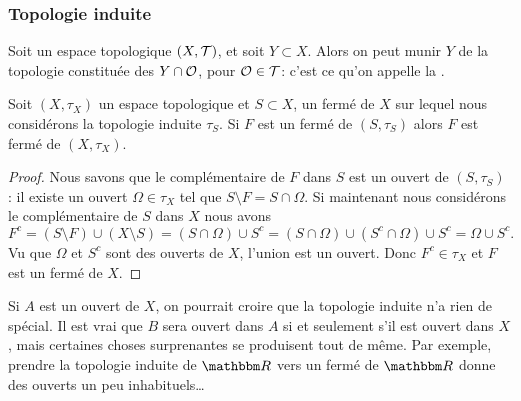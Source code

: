 \subsubsection{Topologie induite}

\begin{definition} \label{DefVLrgWDB}
  Soit un espace topologique \( (X, \mathcal{T}) \), et soit \( Y \subset X \). Alors on peut munir \( Y \) de la topologie constituée des \( Y \cap \mathcal{O} \), pour \( \mathcal{O} \in \mathcal{T} \): c'est ce qu'on appelle la .
\end{definition}


\begin{lemma}        \label{LemBWSUooCCGvax}
    Soit \( (X,\tau_X)\) un espace topologique et \( S\subset X\), un fermé de \( X\) sur lequel nous considérons la topologie induite \( \tau_S\). Si \( F\) est un fermé de \( (S,\tau_S)\) alors \( F\) est fermé de \( (X,\tau_X)\).
\end{lemma}

\begin{proof}
    Nous savons que le complémentaire de \( F\) dans \( S\) est un ouvert de \( (S,\tau_S)\) : il existe un ouvert \( \Omega\in \tau_X\) tel que \( S\setminus F=S\cap \Omega\). Si maintenant nous considérons le complémentaire de \( S\) dans \( X\) nous avons
    \begin{equation}
        F^c=(S\setminus F)\cup (X\setminus S)=(S\cap \Omega)\cup S^c=(S\cap \Omega)\cup(S^c\cap \Omega)\cup S^c=\Omega\cup S^c.
    \end{equation}
    Vu que \( \Omega\) et \( S^c\) sont des ouverts de \( X\), l'union est un ouvert. Donc \( F^c\in \tau_X\) et \( F\) est un fermé de \( X\).
\end{proof}


Si \( A\) est un ouvert de \( X\), on pourrait croire que la topologie induite n'a rien de spécial. Il est vrai que \( B\) sera ouvert dans \( A\) si et seulement s'il est ouvert dans \( X\), mais certaines choses surprenantes se produisent tout de même. Par exemple, prendre la topologie induite de \( \eR\) vers un fermé de \( \eR\) donne des ouverts un peu inhabituels\dots

